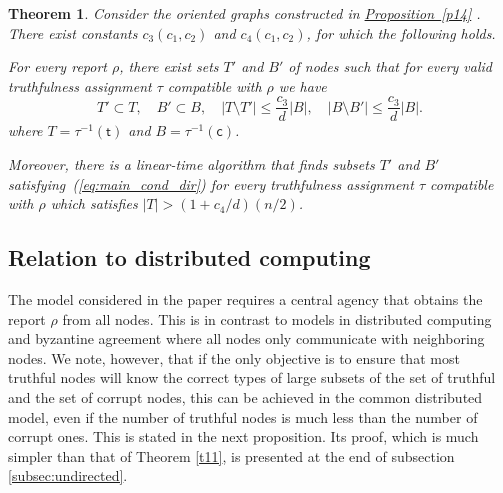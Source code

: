 \documentclass[11pt]{article}
\numberwithin{equation}{section}
\newtheorem{theorem}{Theorem}[section]
\theoremstyle{definition}
\theoremstyle{plain}
\newcommand{\expref}[2]{\hyperref[#2]{#1~\ref{#2}}}
\begin{document}
\begin{theorem}
\label{t15}
%
Consider the oriented graphs constructed in \expref{Proposition}{p14} . 
There exist
%
%
%
constants $c_3(c_1,c_2)$ and $c_4(c_1,c_2)$,
%
for which the following holds. 

%
For every report
$\rho$, there exist sets $T'$ and $B'$ of nodes
such that for every valid truthfulness assignment
$\tau$ compatible with $\rho$ we have
\begin{equation} \label{eq:main_cond_dir}
T' \subset T, \quad B' \subset B, \quad |T \setminus T'| \leq \frac{c_3}{d} |B| , \quad 
|B \setminus B'| \leq  \frac{c_3}{d} |B|. 
\end{equation}
where $T = \tau^{-1}(\mathsf{t})$ and $B =  \tau^{-1}(\mathsf{c})$.

%

Moreover, there is a linear-time
algorithm that finds subsets $T'$ and
$B'$ satisfying~(\ref{eq:main_cond_dir})
for every truthfulness assignment $\tau$
compatible with $\rho$ which
satisfies
$|T| >  (1 +  {c_4}/{d}) ({n}/{2})$.
%
\end{theorem}

%

\subsection{Relation to distributed computing} 
%
The model considered in the paper requires a central agency that 
obtains the report $\rho$ from all nodes. This is in contrast to models in 
distributed computing and byzantine agreement where all nodes 
only communicate with neighboring nodes. We note, however, that if the 
only objective is to ensure that most %
%
truthful nodes will know the correct
types of large subsets of the set of truthful and the set of
corrupt nodes, this can
be achieved in the common distributed model, even if the number
of truthful nodes is much less than the number of corrupt ones. This
is stated in the next proposition. Its proof, which is much simpler
than that of Theorem \ref{t11}, is presented at
the end of subsection \ref{subsec:undirected}.
%
\end{document}
